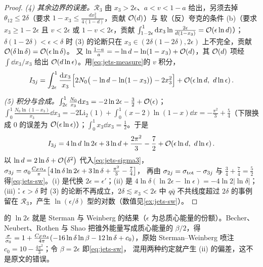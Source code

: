 \begin{proof}
\emph{(4) 其余边界的误差。}$\mathcal R_3$ 由 $x_3>2\epsilon$、$a<v<1-a$ 给出，另须去掉 $\theta_{12}\le2\delta$（要求 $1-x_3\le\frac{dx_3^2}{4(1-d)}$，贡献 $\mathcal{O}\!\left(d\right)$）与
软（反）夸克的条件 (b)（要求 $x_3\ge1-2\epsilon$ 且 $v<2\epsilon$ 或 $1-v<2\epsilon$，贡献 $\int_{1-2\epsilon}^1\mathrm{d} x_3\ln\frac{2\epsilon}{d(1-x_3)}=\mathcal{O}\!\left(\epsilon\ln d\right)$）；
$\delta(1-2\delta)<\epsilon<\delta$ 时 (3) 的论断只在 $x_3\in(2\delta(1-2\delta),2\epsilon)$ 上不完全，贡献 $\mathcal{O}\!\left(\delta\ln\delta\right)=\mathcal{O}\!\left(\epsilon\ln\delta\right)$。
又 $\ln\frac{1-a}{a}=-\ln d-\ln(1-x_3)+\mathcal{O}\!\left(d\right)$，其 $\mathcal{O}\!\left(d\right)$ 项经 $\int\dd x_3/x_3$ 给出 $\mathcal{O}\!\left(d\ln\epsilon\right)$。用\cref{eq:jets-measure}的 $v$ 积分，
\begin{equation}\label{eq:jets-I3-asym}
I_{3j}=\int_{2\epsilon}^1\frac{\dd x_3}{x_3}\Big[2N_0\big(-\ln d-\ln(1-x_3)\big)-2x_3^2\Big]+\order{\epsilon\ln d,\ d\ln\epsilon}.
\end{equation}

\emph{(5) 积分与合成。}$\int_{2\epsilon}^1\frac{N_0}{x_3}\mathrm{d} x_3=-2\ln2\epsilon-\frac32+\mathcal{O}\!\left(\epsilon\right)$；
$\int_0^1\frac{N_0\ln(1-x_3)}{x_3}\dd x_3=-2\mathrm{Li}_2(1)+\int_0^1(x-2)\ln(1-x)\dd x=-\frac{\pi^2}{3}+\frac54$（下限换成 $0$ 的误差为 $\mathcal{O}\!\left(\epsilon\ln\epsilon\right)$）；$\int_0^1x_3\dd x_3=\frac12$。于是
\begin{equation}\label{eq:jets-I3-result}
I_{3j}=4\ln d\,\ln2\epsilon+3\ln d+\frac{2\pi^2}{3}-\frac72+\order{\epsilon\ln d,\ d\ln\epsilon}.
\end{equation}
以 $\ln d=2\ln\delta+\mathcal{O}\!\left(\delta^2\right)$ 代入\cref{eq:jets-sigma3}，$\sigma_{3j}=\sigma_0\frac{C_F\alpha_s}{\pi}\big[4\ln\delta\ln2\epsilon+3\ln\delta+\frac{\pi^2}{3}-\frac74\big]$，
再由 $\sigma_{2j}=\sigma_{\rm tot}-\sigma_{3j}$ 与 $\frac34+\frac74=\frac52$ 得\cref{eq:jets-sw}。(i) 是代换 $2\epsilon=\epsilon'$；(ii) 是 $4\ln\delta(\ln2\epsilon-\ln\epsilon)=-4\ln2|\ln\delta|$；
(iii)：$\epsilon>\delta$ 时 (3) 的论断不再成立，$2\delta\lesssim x_3<2\epsilon$ 中 $q\bar q$ 不共线度超过 $2\delta$ 的事例留在 $\mathcal R_3$，产生 $\ln(\epsilon/\delta)$ 型的对数（数值见\cref{ex:jets-sw}）。
\end{proof}

的 $\ln2\epsilon$ 就是 Sterman 与 Weinberg 的结果（$\epsilon$ 为总质心能量的份额）。Becher、Neubert、Rothen 与 Shao 把锥外能量写成质心能量的 $\beta/2$，得
$\frac{\sigma}{\sigma_0}=1+\frac{C_F\alpha_s}{4\pi}(-16\ln\delta\ln\beta-12\ln\delta+c_0)$，原始 Sterman--Weinberg 喷注 $c_0=10-\frac{4\pi^2}{3}$\cite[式~(1)]{Becher:2015hka}；令 $\beta=2\epsilon$ 即\cref{eq:jets-sw}，
混用两种约定就产生 (ii) 的偏差，这不是原文的错误。

